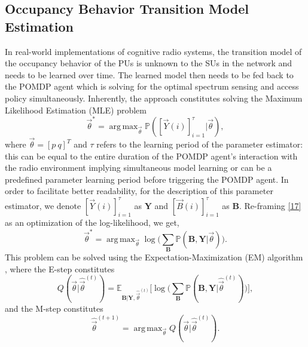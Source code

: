 \documentclass[10pt,twocolumn]{IEEEtran}
\DeclareMathOperator*{\argmax}{arg\,max}
\begin{document}
\subsection{Occupancy Behavior Transition Model Estimation}
In real-world implementations of cognitive radio systems, the transition model of the occupancy behavior of the PUs is unknown to the SUs in the network and needs to be learned over time. The learned model then needs to be fed back to the POMDP agent which is solving for the optimal spectrum sensing and access policy simultaneously. Inherently, the approach constitutes solving the Maximum Likelihood Estimation (MLE) problem
\begin{equation}\label{17}
    \vec{\theta}^{*} = \argmax_{\vec{\theta}} \mathbb{P}([\vec{Y}(i)]_{i=1}^{\tau}|\vec{\theta}),
\end{equation}
where $\vec{\theta}{=}[p\ q]^{T}$ and $\tau$ refers to the learning period of the parameter estimator: this can be equal to the entire duration of the POMDP agent's interaction with the radio environment implying simultaneous model learning or can be a predefined parameter learning period before triggering the POMDP agent. In order to facilitate better readability, for the description of this parameter estimator, we denote $[\vec{Y}(i)]_{i=1}^{\tau}$ as $\mathbf{Y}$ and $[\vec{B}(i)]_{i=1}^{\tau}$ as $\mathbf{B}$. Re-framing \eqref{17} as an optimization of the log-likelihood, we get,
\begin{equation}\label{18}
    \vec{\theta}^{*} = \argmax_{\vec{\theta}} \log\Big(\sum_{\mathbf{B}} \mathbb{P}(\mathbf{B}, \mathbf{Y}| \vec{\theta})\Big).
\end{equation}
This problem can be solved using the Expectation-Maximization (EM) algorithm \cite{778361}, where the E-step constitutes
\begin{equation}
    Q(\vec{\theta}|\hat{\vec{\theta}}^{(t)}) = \mathbb{E}_{\mathbf{B}|\mathbf{Y}, \hat{\vec{\theta}}^{(t)}} \Big[ \log \Big(\sum_{\mathbf{B}} \mathbb{P}(\mathbf{B}, \mathbf{Y}|\hat{\vec{\theta}}^{(t)}) \Big) \Big],
\end{equation}
and the M-step constitutes
\begin{equation}
    \hat{\vec{\theta}}^{(t+1)} = \argmax_{\vec{\theta}} Q(\vec{\theta}|\hat{\vec{\theta}}^{(t)}).
\end{equation}
\end{document}
